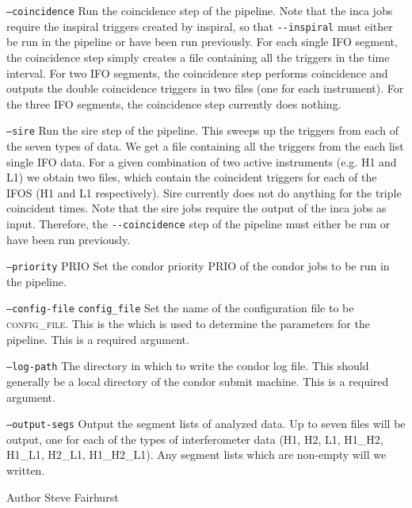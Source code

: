 \begin{entry}
\begin{entry}
\item[\texttt{--coincidence}] Run the coincidence step of the pipeline.  Note
that the inca jobs require the inspiral triggers created by inspiral, so that
\verb$--inspiral$ must either be run in the pipeline or have been run
previously.  For each single IFO segment, the coincidence step simply creates
a file containing all the triggers in the time interval.  For two IFO
segments, the coincidence step performs coincidence and outputs the double
coincidence triggers in two files (one for each instrument).  For the three
IFO segments, the coincidence step currently does nothing.  
\end{entry} 

\begin{entry}
\item[\texttt{--sire}] Run the sire step of the pipeline.  This sweeps up the
triggers from each of the seven types of data.  We get a file containing all
the triggers from the each list single IFO data.  For a given combination of
two active instruments (e.g. H1 and L1) we obtain two files, which contain the
coincident triggers for each of the IFOS (H1 and L1 respectively).  Sire
currently does not do anything for the triple coincident times.  Note that the
sire jobs require the output of the inca jobs as input.  Therefore, the
\verb$--coincidence$ step of the pipeline must either be run or have been run
previously.
\end{entry} 

\begin{entry}
\item[\texttt{--priority} \textsc{PRIO}] Set the condor priority \textsc{PRIO}
of the condor jobs to be run in the pipeline.
\end{entry} 

\begin{entry}
\item[\texttt{--config-file} \texttt{config\_file}] Set the name of the
configuration file to be \textsc{config\_file}.  This is the which is used to
determine the parameters for the pipeline.  This is a required argument.
\end{entry} 
 
\begin{entry}
\item[\texttt{--log-path}] The directory in which to write the condor log
file.  This should generally be a local directory of the condor submit
machine.  This is a required argument.
\end{entry} 

\begin{entry}
\item[\texttt{--output-segs}] Output the segment lists of analyzed data.  Up
to seven files will be output, one for each of the types of interferometer
data (H1, H2, L1, H1\_H2, H1\_L1, H2\_L1, H1\_H2\_L1).  Any segment lists
which are non-empty will we written.
\end{entry} 


\item[Author] 
Steve Fairhurst
\end{entry}

